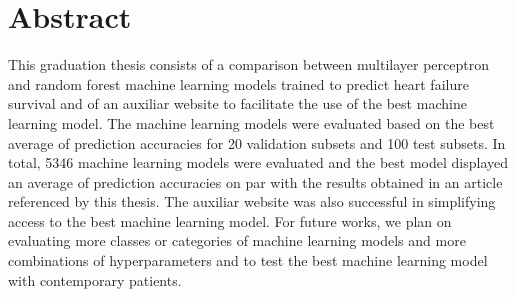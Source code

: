 \chapter*{Abstract}

This graduation thesis consists of a comparison between multilayer perceptron and random forest machine learning models trained to predict heart failure survival and of an auxiliar website to facilitate the use of the best machine learning model. The machine learning models were evaluated based on the best average of prediction accuracies for 20 validation subsets and 100 test subsets. In total, 5346 machine learning models were evaluated and the best model displayed an average of prediction accuracies on par with the results obtained in an article referenced by this thesis. The auxiliar website was also successful in simplifying access to the best machine learning model. For future works, we plan on evaluating more classes or categories of machine learning models and more combinations of hyperparameters and to test the best machine learning model with contemporary patients.
